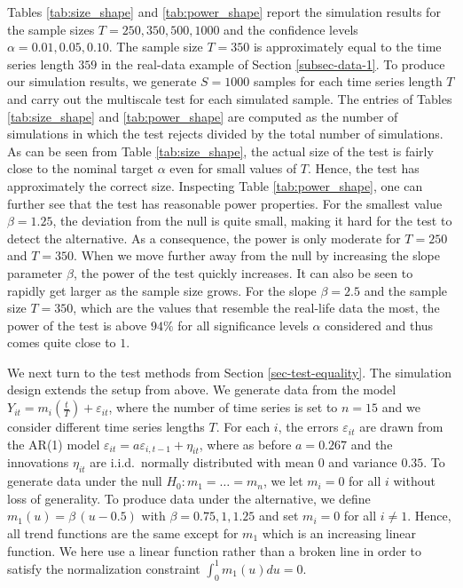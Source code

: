 Tables \ref{tab:size_shape} and \ref{tab:power_shape} report the simulation results for the sample sizes $T=250,350,500, 1000$ and the confidence levels $\alpha = 0.01, 0.05, 0.10$. The sample size $T = 350$ is approximately equal to the time series length $359$ in the real-data example of Section \ref{subsec-data-1}. To produce our simulation results, we generate $S=1000$ samples for each time series length $T$ and carry out the multiscale test for each simulated sample. The entries of Tables \ref{tab:size_shape} and \ref{tab:power_shape} are computed as the number of simulations in which the test rejects divided by the total number of simulations. As can be seen from Table \ref{tab:size_shape}, the actual size of the test is fairly close to the nominal target $\alpha$ even for small values of $T$. Hence, the test has approximately the correct size. Inspecting Table \ref{tab:power_shape}, one can further see that the test has reasonable power properties. For the smallest value $\beta = 1.25$, the deviation from the null is quite small, making it hard for the test to detect the alternative. As a consequence, the power is only moderate for $T=250$ and $T=350$. When we move further away from the null by increasing the slope parameter $\beta$, the power of the test quickly increases. It can also be seen to rapidly get larger as the sample size grows. For the slope $\beta =2.5$ and the sample size $T=350$, which are the values that resemble the real-life data the most, the power of the test is above $94\%$ for all significance levels $\alpha$ considered and thus comes quite close to $1$. 


We next turn to the test methods from Section \ref{sec-test-equality}. The simulation design extends the setup from above. We generate data from the model $Y_{it} = m_i(\frac{t}{T}) + \varepsilon_{it}$, where the number of time series is set to $n = 15$ and we consider different time series lengths $T$. For each $i$, the errors $\varepsilon_{it}$ are drawn from the AR(1) model $\varepsilon_{it} = a \varepsilon_{i,t-1} + \eta_{it}$, where as before $a = 0.267$ and the innovations $\eta_{it}$ are i.i.d.\ normally distributed with mean $0$ and variance $0.35$. To generate data under the null $H_0: m_1 = \ldots = m_n$, we let $m_i = 0$ for all $i$ without loss of generality. To produce data under the alternative, we define $m_1(u) = \beta \, (u - 0.5) $ with $\beta = 0.75, 1, 1.25$ and set $m_i = 0$ for all $i \ne 1$. Hence, all trend functions are the same except for $m_1$ which is an increasing linear function. We here use a linear function rather than a broken line in order to satisfy the normalization constraint $\int_0^1 m_1(u) du = 0$. 


